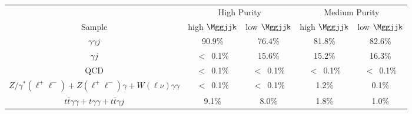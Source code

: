 \begin{tabular}{|c|c|c|c|c|}
\hline
 & \multicolumn{2}{c|}{High Purity} & \multicolumn{2}{c|}{Medium Purity} \\
Sample & high $\Mggjjk$ & low $\Mggjjk$ & high $\Mggjjk$ & low $\Mggjjk$ \\
\hline
$\gamma\gamma j$     &  90.9\% & 76.4\%  & 81.8\% & 82.6\% \\
$\gamma j$           & $<$~0.1\% & 15.6\% & 15.2\%  & 16.3\%  \\
QCD                  & $<$~0.1\% & $<$~0.1\% & $<$~0.1\% & $<$~0.1\% \\
$Z/\gamma^*(\ell^+\ell^-) + Z(\ell^+\ell^-)\gamma + W(\ell\nu)\gamma\gamma$
   & $<$~0.1\% & $<$~0.1\% & 1.2\% & 0.1\% \\
$t\bar{t}\gamma\gamma + t\gamma\gamma + t\bar{t}\gamma j$ &  9.1\% & 8.0\% & 1.8\% & 1.0\% \\
\hline
\end{tabular}
